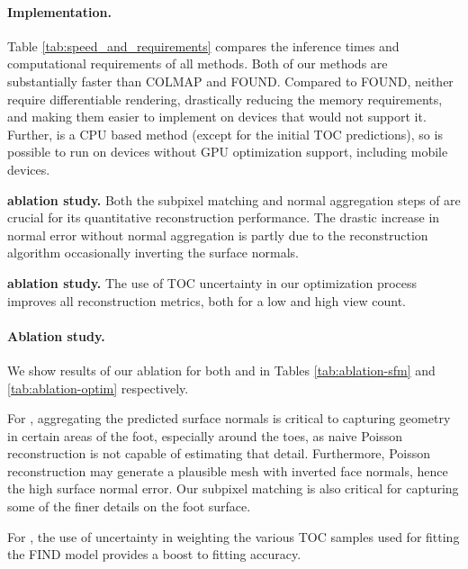 \paragraph{Implementation.} Table \ref{tab:speed_and_requirements} compares the inference times and computational requirements of all methods. Both of our methods are substantially faster than COLMAP and FOUND. Compared to FOUND, neither require differentiable rendering, drastically reducing the memory requirements, and making them easier to implement on devices that would not support it. Further, \ourSfM is a CPU based method (except for the initial TOC predictions), so is possible to run on devices without GPU optimization support, including mobile devices.

\begin{table}
    \centering
    \begingroup
    \footnotesize
    \centering
    
    \endgroup
    \caption{\textbf{\ourSfM ablation study.} Both the subpixel matching and normal aggregation steps of \ourSfM are crucial for its quantitative reconstruction performance. The drastic increase in normal error without normal aggregation is partly due to the reconstruction algorithm occasionally inverting the surface normals.}
    \label{tab:ablation-sfm}
\end{table}

\begin{table}
    \centering
    \begingroup
    \footnotesize
    \centering
    
    \endgroup
    \caption{\textbf{\ourOptim ablation study.} The use of TOC uncertainty in our optimization process improves all reconstruction metrics, both for a low and high view count.}
    \label{tab:ablation-optim}
\end{table}

\paragraph{Ablation study.} We show results of our ablation for both \ourSfM and \ourOptim in Tables \ref{tab:ablation-sfm} and \ref{tab:ablation-optim} respectively.

For \ourSfM, aggregating the predicted surface normals is critical to capturing geometry in certain areas of the foot, especially around the toes, as naive Poisson reconstruction is not capable of estimating that detail. Furthermore, Poisson reconstruction may generate a plausible mesh with inverted face normals, hence the high surface normal error.
Our subpixel matching is also critical for capturing some of the finer details on the foot surface.

For \ourOptim, the use of uncertainty in weighting the various TOC samples used for fitting the FIND model provides a boost to fitting accuracy.